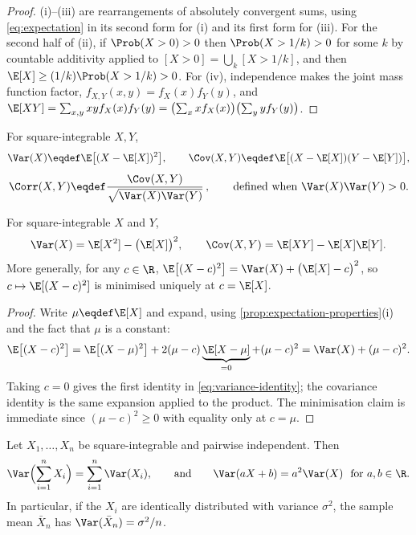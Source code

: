 \begin{proof}
	(i)--(iii) are rearrangements of absolutely convergent sums, using
	\eqref{eq:expectation} in its second form for (i) and its first form for (iii).
	For the second half of (ii), if $\Prob(X>0)>0$ then $\Prob(X>1/k)>0$ for some
	$k$ by countable additivity applied to $[X>0]=\bigcup_k[X>1/k]$, and then
	$\E[X]\geq(1/k)\Prob(X>1/k)>0$. For (iv), independence makes the joint mass
	function factor, $f_{X,Y}(x,y)=f_X(x)f_Y(y)$, and
	$\E[XY]=\sum_{x,y}xyf_X(x)f_Y(y)=\bigl(\sum_xxf_X(x)\bigr)\bigl(\sum_yyf_Y(y)\bigr)$.
\end{proof}

\begin{definition}\label{def:variance}
	For square-integrable $X,Y$,
	\[
		\Var(X)\eqdef\E\bigl[(X-\E[X])^{2}\bigr],
		\qquad
		\Cov(X,Y)\eqdef\E\bigl[(X-\E[X])(Y-\E[Y])\bigr],
	\]
	\[
		\Corr(X,Y)\eqdef\frac{\Cov(X,Y)}{\sqrt{\Var(X)\Var(Y)}}\,,
		\qquad\text{defined when }\Var(X)\Var(Y)>0 .
	\]
\end{definition}

\begin{proposition}\label{prop:variance-identity}
	For square-integrable $X$ and $Y$,
	\begin{equation}\label{eq:variance-identity}
		\Var(X)=\E[X^{2}]-\bigl(\E[X]\bigr)^{2},
		\qquad
		\Cov(X,Y)=\E[XY]-\E[X]\E[Y] .
	\end{equation}
	More generally, for any $c\in\R$,
	$\E\bigl[(X-c)^{2}\bigr]=\Var(X)+\bigl(\E[X]-c\bigr)^{2}$, so
	$c\mapsto\E[(X-c)^{2}]$ is minimised uniquely at $c=\E[X]$.
\end{proposition}

\begin{proof}
	Write $\mu\eqdef\E[X]$ and expand, using
	\autoref{prop:expectation-properties}(i) and the fact that $\mu$ is a constant:
	\[
		\E\bigl[(X-c)^{2}\bigr]
		=\E\bigl[(X-\mu)^{2}\bigr]+2(\mu-c)\underbrace{\E[X-\mu]}_{=0}+(\mu-c)^{2}
		=\Var(X)+(\mu-c)^{2}.
	\]
	Taking $c=0$ gives the first identity in \eqref{eq:variance-identity}; the
	covariance identity is the same expansion applied to the product. The
	minimisation claim is immediate since $(\mu-c)^{2}\geq0$ with equality only at
	$c=\mu$.
\end{proof}

\begin{proposition}\label{prop:variance-independent}
	Let $X_1,\dots,X_n$ be square-integrable and pairwise independent. Then
	\[
		\Var\Bigl(\sum_{i=1}^{n}X_i\Bigr)=\sum_{i=1}^{n}\Var(X_i),
		\qquad\text{and}\qquad
		\Var(aX+b)=a^{2}\Var(X)\ \text{ for }a,b\in\R .
	\]
	In particular, if the $X_i$ are identically distributed with variance
	$\sigma^{2}$, the sample mean $\bar X_n$ has $\Var(\bar X_n)=\sigma^{2}/n$.
\end{proposition}

